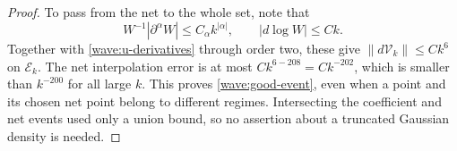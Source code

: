 \begin{proof}
To pass from the net to the whole set, note that
\[
 W^{-1}|\partial^\alpha W|\le C_\alpha k^{|\alpha|},\qquad
 |d\log W|\le Ck.
\]
Together with \eqref{wave:u-derivatives} through order two, these
give $\|d\mathcal V_k\|\le Ck^6$ on $\mathcal E_k$.
The net interpolation error is at most $Ck^{6-208}=Ck^{-202}$,
which is smaller than $k^{-200}$ for all large $k$. This proves
\eqref{wave:good-event}, even when a point and its chosen net point
belong to different regimes. Intersecting the coefficient and net
events used only a union bound, so no assertion about a truncated
Gaussian density is needed.
\end{proof}
